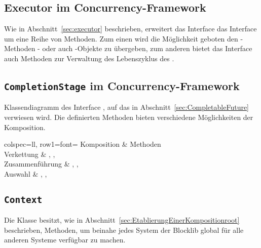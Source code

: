 \subsection{Executor im Concurrency-Framework}\label{appendix:concFrameworkExecutor}


Wie in Abschnitt~\vref{sec:executor} beschrieben, erweitert das Interface \classExecutorService{} das Interface \classExecutor{} um eine Reihe von Methoden. Zum einen wird die Möglichkeit geboten den -Methoden \classRunnable{}- oder auch \classCallable{}-Objekte zu übergeben, zum anderen bietet das Interface auch Methoden zur Verwaltung des Lebenszyklus des \classExecutorService{}.

\clearpage
\subsection{\texttt{CompletionStage} im Concurrency-Framework}\label{appendix:CompletionStage}


Klassendiagramm des Interface \classCompletionStage{}, auf das in Abschnitt~\vref{sec:CompletableFuture} verwiesen wird. Die definierten Methoden bieten verschiedene Möglichkeiten der Komposition.

\begin{tblr}{
	colspec={ll},
	row{1}={font=\bfseries}
	}
	Komposition & Methoden \\
	Verkettung & , , \\
	Zusammenführung & , ,  \\
	Auswahl & , ,  \\
\end{tblr}

\clearpage
\subsection{\texttt{Context}}\label{appendix:context}
{
	\centering
	
	\par
}
Die Klasse \classContext{} besitzt, wie in Abschnitt~\vref{sec:EtablierungEinerKompositionroot} beschrieben, Methoden, um beinahe jedes System der Blocklib global für alle anderen Systeme verfügbar zu machen. 

